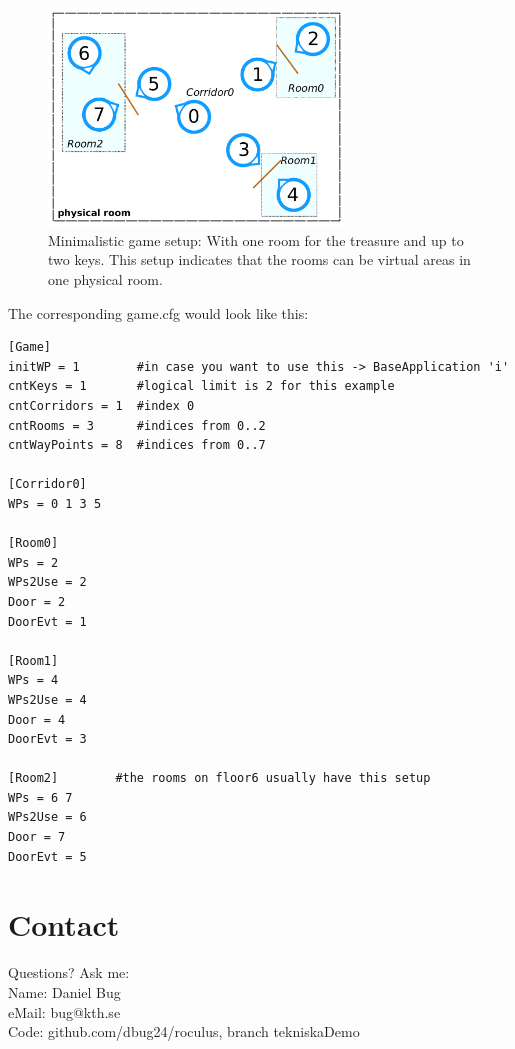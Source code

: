 \documentclass[a4paper, 12pt]{article}
\begin{document}
\begin{figure}[h!]
  \centering
  \includegraphics[width=0.7\textwidth]{./minigame.pdf}
  \caption{Minimalistic game setup: With one room for the treasure and up to two keys. This setup indicates that the rooms can be virtual areas in one physical room.}
  \label{fig:minigame}
\end{figure}
\newpage
The corresponding game.cfg would look like this:
\begin{lstlisting}
[Game]
initWP = 1        #in case you want to use this -> BaseApplication 'i'
cntKeys = 1       #logical limit is 2 for this example
cntCorridors = 1  #index 0
cntRooms = 3      #indices from 0..2
cntWayPoints = 8  #indices from 0..7

[Corridor0]
WPs = 0 1 3 5

[Room0]
WPs = 2
WPs2Use = 2
Door = 2
DoorEvt = 1

[Room1]
WPs = 4
WPs2Use = 4
Door = 4
DoorEvt = 3

[Room2]        #the rooms on floor6 usually have this setup
WPs = 6 7
WPs2Use = 6
Door = 7
DoorEvt = 5
\end{lstlisting}

\section*{Contact}
Questions? Ask me:\\
Name: Daniel Bug\\
eMail: bug@kth.se\\

Code: github.com/dbug24/roculus, branch tekniskaDemo
\end{document}
